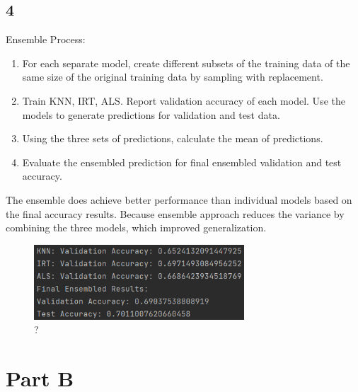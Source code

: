 \documentclass{article}
\begin{document}
\subsection*{4}
Ensemble Process:
\begin{enumerate}
    \item For each separate model, create different subsets of the training data of the same size of the original training data by sampling with replacement. 
    \item Train KNN, IRT, ALS. Report validation accuracy of each model. Use the models to generate predictions for validation and test data.
    \item Using the three sets of predictions, calculate the mean of predictions.
    \item Evaluate the ensembled prediction for final ensembled validation and test accuracy.
\end{enumerate}
The ensemble does achieve better performance than individual models based on the final accuracy results. Because ensemble approach reduces the variance by combining the three models, which improved generalization.
\begin{figure}[H]
    \centering
    \includegraphics[width=0.7\textwidth]{4.png}
    \caption{?}
\end{figure}



\newpage
\section*{Part B}
\end{document}
